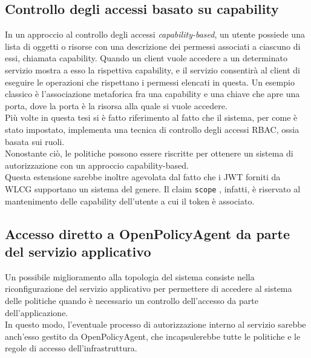 \subsection{Controllo degli accessi basato su capability}
In un approccio al controllo degli accessi \textit{capability-based}, un utente possiede una lista di oggetti o risorse con una descrizione dei 
permessi associati a ciascuno di essi, chiamata capability. Quando un client vuole accedere a un determinato servizio mostra a esso la rispettiva
 capability, e il servizio consentirà al client di eseguire le operazioni che rispettano i permessi elencati in questa.  
 Un esempio classico è l'associazione metaforica fra una capability e una chiave che apre una porta, dove la porta è la risorsa alla quale si vuole accedere.  
\\ Più volte in questa tesi si è fatto riferimento al fatto che il sistema, per come è stato impostato, implementa una tecnica 
di controllo degli accessi RBAC, ossia basata sui ruoli.
\\ Nonostante ciò, le politiche possono essere riscritte per ottenere un sistema di autorizzazione con un approccio capability-based.
\\ Questa estensione sarebbe inoltre agevolata dal fatto che i JWT forniti da WLCG supportano un sistema del genere. Il claim \texttt{scope} \cite{wlcg_jwt}, infatti,
 è riservato al mantenimento delle capability dell'utente a cui il token è associato. 

\subsection{Accesso diretto a OpenPolicyAgent da parte del servizio applicativo}
Un possibile miglioramento alla topologia del sistema consiste nella riconfigurazione del servizio applicativo 
per permettere di accedere al sistema delle politiche quando è necessario un controllo dell'accesso da parte dell'applicazione. 
\\ In questo modo, l'eventuale processo di autorizzazione interno al servizio sarebbe anch'esso gestito da OpenPolicyAgent, 
che incapsulerebbe tutte le politiche e le regole di accesso dell'infrastruttura.

